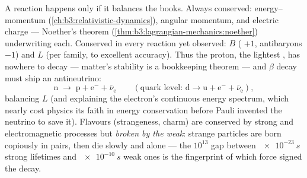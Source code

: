 \begin{proposition}\label{prop:b3:particle-physics:conservation}
A reaction happens only if it balances the books. Always
conserved: energy--momentum
(\cref{ch:b3:relativistic-dynamics}), angular momentum, and
electric charge --- Noether's theorem
(\cref{thm:b3:lagrangian-mechanics:noether}) underwriting each.
Conserved in every reaction yet observed: \emph{}
$B$ ( $+1$, antibaryons $-1$) and \emph{}
$L$ (per family, to excellent accuracy). Thus the proton, the
lightest , has nowhere to decay --- matter's stability is
a bookkeeping theorem --- and $\beta$ decay must ship an
antineutrino:
\[
\text{n} \;\to\; \text{p} + \text{e}^- + \bar\nu_{\text{e}}
\qquad (\text{quark level: } \text{d} \to \text{u} +
\text{e}^- + \bar\nu_{\text{e}}) ,
\]
balancing $L$ (and explaining the electron's continuous energy
spectrum, which nearly cost physics its faith in energy
conservation before Pauli invented the neutrino to save it).
Flavours (strangeness, charm) are conserved by strong and
electromagnetic processes but \emph{broken by the weak}: strange
particles are born copiously in pairs, then die slowly and alone
--- the $10^{13}$ gap between $\qty{e-23}{s}$ strong lifetimes
and $\qty{e-10}{s}$ weak ones is the fingerprint of which force
signed the decay.
\end{proposition}
\admitted

